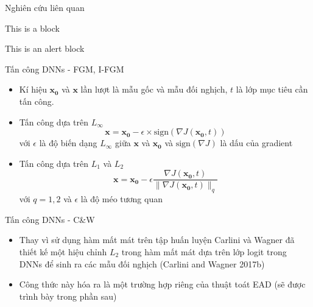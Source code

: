 \begin{frame}{Nghiên cứu liên quan}
    \begin{block}{This is a block}
        \lipsum[1][1-3]
    \end{block}   
    \begin{alertblock}{This is an alert block}
        \lipsum[2][2-5]
    \end{alertblock}  
\end{frame}

\begin{frame}{Tấn công DNNs - FGM, I-FGM}
    \begin{itemize}
        \item Kí hiệu $\mathbf{x_0}$ và $\mathbf{x}$ lần lượt là mẫu gốc và mẫu đối nghịch,
        $t$ là lớp mục tiêu cần tấn công.

        \item Tấn công dựa trên $L_{\infty}$
        \begin{equation}
            \mathbf{x} = \mathbf{x_0} - \epsilon \times \text{sign}(\nabla J(\mathbf{x_0}, t))
        \end{equation}
        với $\epsilon$ là độ biến dạng $L_{\infty}$ giữa $\mathbf{x}$ và $\mathbf{x_0}$ và 
        $\text{sign}(\nabla J)$ là dấu của gradient
        
        \item Tấn công dựa trên $L_1$ và $L_2$
        \begin{equation}
            \mathbf{x} = \mathbf{x_0} - \epsilon \frac{\nabla J(\mathbf{x_0}, t)}
            {\lVert \nabla J(\mathbf{x_0}, t) \rVert _q}
        \end{equation}
        với $q = 1,2$ và $\epsilon$ là độ méo tương quan
    \end{itemize}
\end{frame}

\begin{frame}{Tấn công DNNs - C\&W}
    \begin{itemize}
        \item Thay vì sử dụng hàm mất mát trên tập huấn luyện Carlini và Wagner
        đã thiết kế  một hiệu chỉnh $L_2$ trong hàm mất mát dựa trên lớp logit trong DNNs để sinh 
        ra các mẫu đối nghịch (Carlini and Wagner 2017b)
        \item Công thức này hóa ra là một trường hợp riêng của thuật toát EAD (sẽ được trình bày trong phần sau)
    \end{itemize}
\end{frame}

